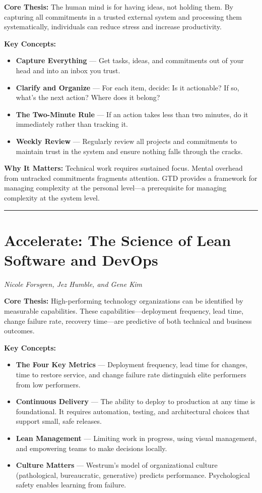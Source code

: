 \documentclass[11pt, letterpaper]{article}
\begin{document}
\textbf{Core Thesis:} The human mind is for having ideas, not holding them. By capturing all commitments in a trusted external system and processing them systematically, individuals can reduce stress and increase productivity.

\textbf{Key Concepts:}
\begin{itemize}
    \item \textbf{Capture Everything} --- Get tasks, ideas, and commitments out of your head and into an inbox you trust.
    \item \textbf{Clarify and Organize} --- For each item, decide: Is it actionable? If so, what's the next action? Where does it belong?
    \item \textbf{The Two-Minute Rule} --- If an action takes less than two minutes, do it immediately rather than tracking it.
    \item \textbf{Weekly Review} --- Regularly review all projects and commitments to maintain trust in the system and ensure nothing falls through the cracks.
\end{itemize}

\textbf{Why It Matters:} Technical work requires sustained focus. Mental overhead from untracked commitments fragments attention. GTD provides a framework for managing complexity at the personal level---a prerequisite for managing complexity at the system level.

\vspace{1em}

\hrule

\vspace{1em}

\section*{Accelerate: The Science of Lean Software and DevOps}
\textit{Nicole Forsgren, Jez Humble, and Gene Kim}

\textbf{Core Thesis:} High-performing technology organizations can be identified by measurable capabilities. These capabilities---deployment frequency, lead time, change failure rate, recovery time---are predictive of both technical and business outcomes.

\textbf{Key Concepts:}
\begin{itemize}
    \item \textbf{The Four Key Metrics} --- Deployment frequency, lead time for changes, time to restore service, and change failure rate distinguish elite performers from low performers.
    \item \textbf{Continuous Delivery} --- The ability to deploy to production at any time is foundational. It requires automation, testing, and architectural choices that support small, safe releases.
    \item \textbf{Lean Management} --- Limiting work in progress, using visual management, and empowering teams to make decisions locally.
    \item \textbf{Culture Matters} --- Westrum's model of organizational culture (pathological, bureaucratic, generative) predicts performance. Psychological safety enables learning from failure.
\end{itemize}
\end{document}
